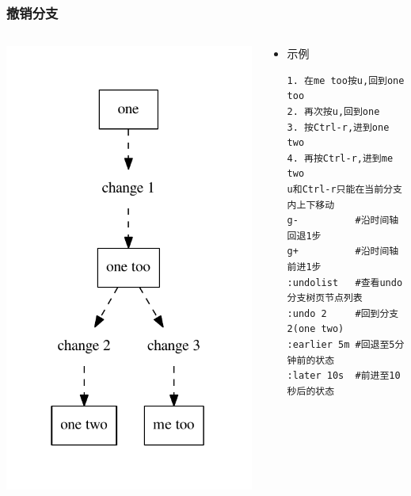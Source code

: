 \documentclass[xcolor=svgnames,presentation]{beamer}
\begin{document}
\begin{frame}[fragile]
\frametitle{撤销分支}
\label{sec-4-3-3}
\begin{columns}
\begin{column}{0.3\textwidth}
\label{sec-4-3-3-1}

\includegraphics[width=.9\linewidth]{img/undotree.pdf}
\end{column}
\begin{column}{0.7\textwidth}
\begin{itemize}

\item 示例\\
\label{sec-4-3-3-2}%
\begin{verbatim}
1. 在me too按u,回到one too
2. 再次按u,回到one
3. 按Ctrl-r,进到one two
4. 再按Ctrl-r,进到me two
u和Ctrl-r只能在当前分支内上下移动
g-          #沿时间轴回退1步
g+          #沿时间轴前进1步
:undolist   #查看undo分支树页节点列表
:undo 2     #回到分支2(one two)
:earlier 5m #回退至5分钟前的状态
:later 10s  #前进至10秒后的状态
\end{verbatim}
\end{itemize} %
\end{column}
\end{columns}
\end{frame}
\end{document}
